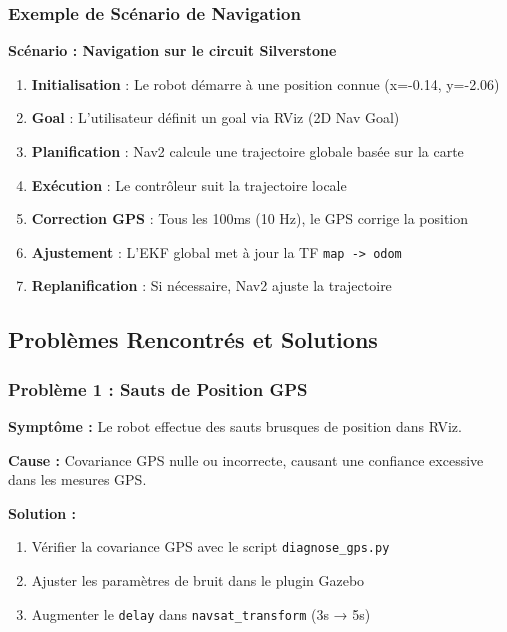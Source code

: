 \documentclass[a4paper,12pt]{article}
\begin{document}
\subsubsection{Exemple de Scénario de Navigation}

\textbf{Scénario : Navigation sur le circuit Silverstone}

\begin{enumerate}
    \item \textbf{Initialisation} : Le robot démarre à une position connue (x=-0.14, y=-2.06)
    \item \textbf{Goal} : L'utilisateur définit un goal via RViz (2D Nav Goal)
    \item \textbf{Planification} : Nav2 calcule une trajectoire globale basée sur la carte
    \item \textbf{Exécution} : Le contrôleur suit la trajectoire locale
    \item \textbf{Correction GPS} : Tous les 100ms (10 Hz), le GPS corrige la position
    \item \textbf{Ajustement} : L'EKF global met à jour la TF \texttt{map -> odom}
    \item \textbf{Replanification} : Si nécessaire, Nav2 ajuste la trajectoire
\end{enumerate}

\subsection{Problèmes Rencontrés et Solutions}

\subsubsection{Problème 1 : Sauts de Position GPS}

\textbf{Symptôme :} Le robot effectue des sauts brusques de position dans RViz.

\textbf{Cause :} Covariance GPS nulle ou incorrecte, causant une confiance excessive dans les mesures GPS.

\textbf{Solution :}
\begin{enumerate}
    \item Vérifier la covariance GPS avec le script \texttt{diagnose\_gps.py}
    \item Ajuster les paramètres de bruit dans le plugin Gazebo
    \item Augmenter le \texttt{delay} dans \texttt{navsat\_transform} (3s → 5s)
\end{enumerate}
\end{document}
